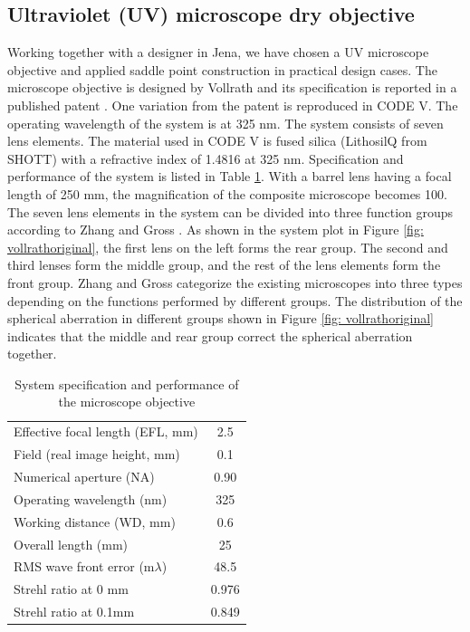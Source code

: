 \subsection{Ultraviolet (UV) microscope dry objective}
Working together with a designer in Jena, we have chosen a UV microscope objective and applied saddle point construction in practical design cases. The microscope objective is designed by Vollrath and its specification is reported in a published patent \cite{patentvollrath}. One variation from the patent is reproduced in CODE V. The operating wavelength of the system is at 325 nm. The system consists of seven lens elements. The material used in CODE V is fused silica (LithosilQ from SHOTT) with a refractive index of 1.4816 at 325 nm. Specification and performance of the system is listed in Table \ref{table: vollrathspec}. With a barrel lens having a focal length of 250 mm, the magnification of the composite microscope becomes 100. The seven lens elements in the system can be divided into three function groups according to Zhang and Gross \cite{ZhangMicroscope2017}. As shown in the system plot in Figure \ref{fig: vollrathoriginal}, the first lens on the left forms the rear group. The second and third lenses form the middle group, and the rest of the lens elements form the front group. Zhang and Gross categorize the existing microscopes into three types depending on the functions performed by different groups. The distribution of the spherical aberration in different groups shown in Figure \ref{fig: vollrathoriginal} indicates that the middle and rear group correct the spherical aberration together. 

\setlength{\arrayrulewidth}{.5mm}
\setlength{\tabcolsep}{18pt}
\renewcommand{\arraystretch}{1.2}
\begin{table}[h!]
    \centering
    \captionsetup{justification=centering}
    \caption{System specification and performance of the microscope objective}
    \label{table: vollrathspec}
    \vspace{-1em}
    \begin{tabular}{ p{15em}  c }
    \hline 
    Effective focal length (EFL, mm) & 2.5\\ 
    Field (real image height, mm) & 0.1\\ 
    Numerical aperture (NA) & 0.90\\ 
    Operating wavelength (nm) & 325\\ 
    Working distance (WD, mm) & 0.6\\ 
    Overall length (mm) & 25\\
    \midrule
    RMS wave front error (m$\lambda$) & 48.5\\ 
    Strehl ratio at 0 mm & 0.976\\ 
    Strehl ratio at 0.1mm & 0.849\\
    \hline
    \end{tabular}
\end{table}


